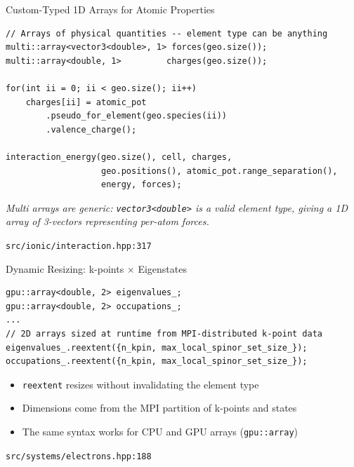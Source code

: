 \begin{frame}[fragile,label=inq2]{Custom-Typed 1D Arrays for Atomic Properties}
\begin{lstlisting}
// Arrays of physical quantities -- element type can be anything
multi::array<vector3<double>, 1> forces(geo.size());
multi::array<double, 1>         charges(geo.size());

for(int ii = 0; ii < geo.size(); ii++)
    charges[ii] = atomic_pot
        .pseudo_for_element(geo.species(ii))
        .valence_charge();

interaction_energy(geo.size(), cell, charges,
                   geo.positions(), atomic_pot.range_separation(),
                   energy, forces);
\end{lstlisting}
\textit{Multi arrays are generic: \texttt{vector3<double>} is a valid element type,
giving a 1D array of 3-vectors representing per-atom forces.}

\vspace{0.3em}
\tiny\texttt{src/ionic/interaction.hpp:317}
\end{frame}

\begin{frame}[fragile,label=inq3]{Dynamic Resizing: k-points $\times$ Eigenstates}
\begin{lstlisting}
gpu::array<double, 2> eigenvalues_;
gpu::array<double, 2> occupations_;
...
// 2D arrays sized at runtime from MPI-distributed k-point data
eigenvalues_.reextent({n_kpin, max_local_spinor_set_size_});
occupations_.reextent({n_kpin, max_local_spinor_set_size_});
\end{lstlisting}
\vspace{0.5em}
\begin{itemize}
  \item \texttt{reextent} resizes without invalidating the element type
  \item Dimensions come from the MPI partition of k-points and states
  \item The same syntax works for CPU and GPU arrays (\texttt{gpu::array})
\end{itemize}

\vspace{0.3em}
\tiny\texttt{src/systems/electrons.hpp:188}
\end{frame}

